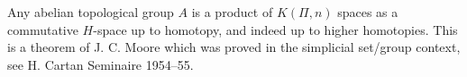 Any abelian topological group $A$ is a product of $K(\Pi, n)$ spaces as a commutative $H$-space up to homotopy, and indeed up to higher homotopies. This is a theorem of J. C. Moore which was proved in the simplicial set/group context, see H. Cartan Seminaire 1954--55.
